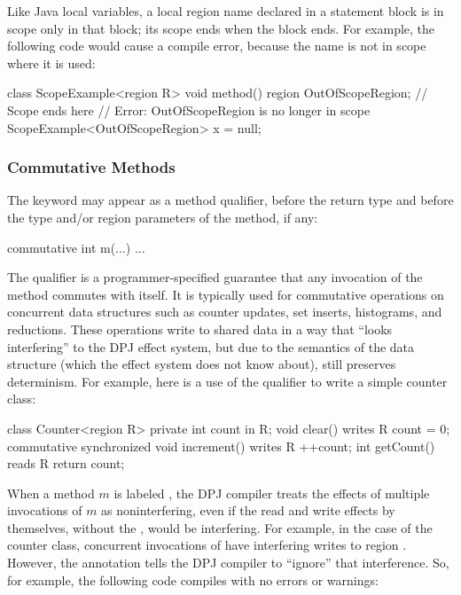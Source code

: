 Like Java local variables, a local region name declared in a statement
block is in scope only in that block; its scope ends when the block
ends.  For example, the following code would cause a compile error,
because the name  is not in scope where it is
used:
%
\begin{dpjlisting}
class ScopeExample<region R> {
  void method() {
    {
      region OutOfScopeRegion;
      // Scope ends here
    }
    // Error:  OutOfScopeRegion is no longer in scope
    ScopeExample<OutOfScopeRegion> x = null;
  }
}
\end{dpjlisting}

\subsubsection{Commutative Methods%
\label{sec:classes:methods:commutative}}

The keyword  may appear as a method qualifier, before
the return type and before the type and/or region parameters of the
method, if any:

\begin{dpjlisting}
commutative int m(...) { ... }
\end{dpjlisting}

The  qualifier is a programmer-specified guarantee
that any invocation of the method commutes with itself.  It is
typically used for commutative operations on concurrent data
structures such as counter updates, set inserts, histograms, and
reductions.  These operations write to shared data in a way that
``looks interfering'' to the DPJ effect system, but due to the
semantics of the data structure (which the effect system does not know
about), still preserves determinism.  For example, here is a use of
the  qualifier to write a simple counter class:

\begin{dpjlisting}
class Counter<region R> {
  private int count in R;
  void clear() writes R { count = 0; }
  commutative synchronized void increment() 
    writes R 
  {
    ++count;
  }
  int getCount() reads R { return count; }
}
\end{dpjlisting}

When a method $m$ is labeled , the DPJ compiler
treats the effects of multiple invocations of $m$ as noninterfering,
even if the read and write effects by themselves, without the
, would be interfering.  For example, in the case of
the counter class, concurrent invocations of  have
interfering writes to region .  However, the 
annotation tells the DPJ compiler to ``ignore'' that interference.
So, for example, the following code compiles with no errors or
warnings:

